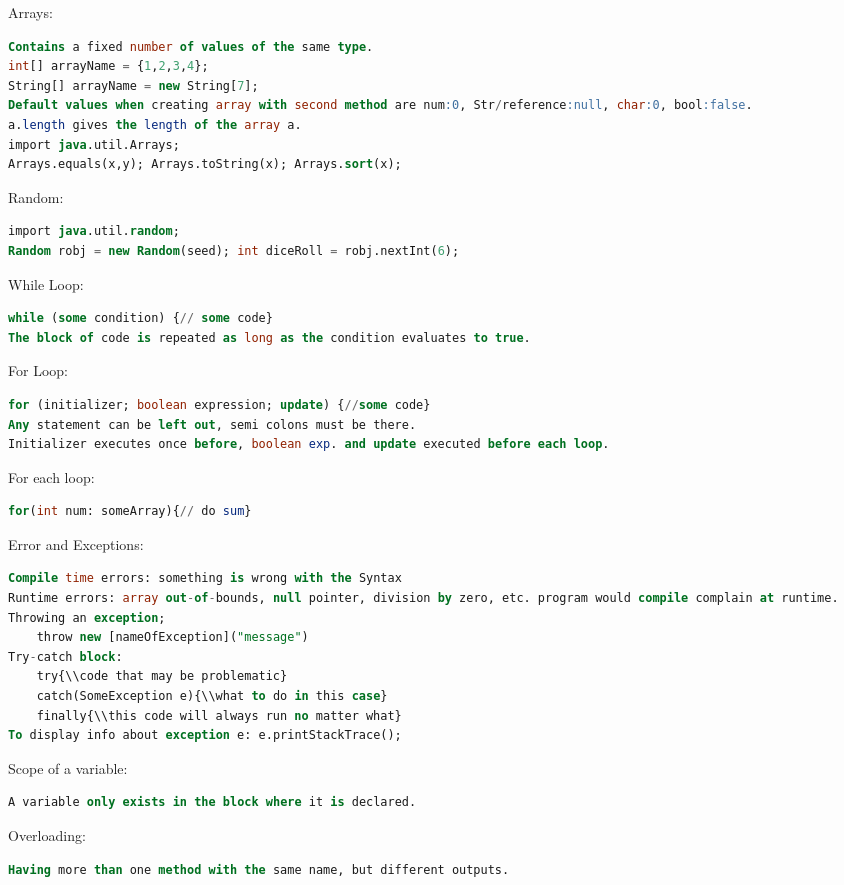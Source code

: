 \documentclass[10pt,landscape]{article}
\begin{document}
\begin{multicols}{3}
Arrays:
\begin{lstlisting}[language=SQL]
Contains a fixed number of values of the same type. 
int[] arrayName = {1,2,3,4};
String[] arrayName = new String[7];
Default values when creating array with second method are num:0, Str/reference:null, char:0, bool:false.
a.length gives the length of the array a. 
import java.util.Arrays;
Arrays.equals(x,y); Arrays.toString(x); Arrays.sort(x);
\end{lstlisting}
Random:
\begin{lstlisting}[language=SQL]
import java.util.random; 
Random robj = new Random(seed); int diceRoll = robj.nextInt(6);    
\end{lstlisting}
While Loop:
\begin{lstlisting}[language=SQL]
while (some condition) {// some code} 
The block of code is repeated as long as the condition evaluates to true. 
\end{lstlisting}
For Loop:
\begin{lstlisting}[language=SQL]
for (initializer; boolean expression; update) {//some code}
Any statement can be left out, semi colons must be there. 
Initializer executes once before, boolean exp. and update executed before each loop.
\end{lstlisting}
For each loop:
\begin{lstlisting}[language=SQL]
for(int num: someArray){// do sum}
\end{lstlisting}
Error and Exceptions:
\begin{lstlisting}[language=SQL]
Compile time errors: something is wrong with the Syntax
Runtime errors: array out-of-bounds, null pointer, division by zero, etc. program would compile complain at runtime.
Throwing an exception;
    throw new [nameOfException]("message")
Try-catch block:
    try{\\code that may be problematic} 
    catch(SomeException e){\\what to do in this case}
    finally{\\this code will always run no matter what}
To display info about exception e: e.printStackTrace();
\end{lstlisting}
Scope of a variable:
\begin{lstlisting}[language=SQL]
A variable only exists in the block where it is declared.     
\end{lstlisting}
Overloading:
\begin{lstlisting}[language=SQL]
Having more than one method with the same name, but different outputs. 
\end{lstlisting}

\end{multicols}
\end{document}
